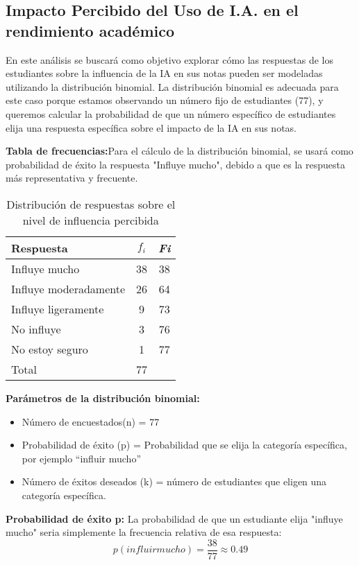 \subsection{Impacto Percibido del Uso de I.A. en el rendimiento académico}
En este análisis se buscará como objetivo explorar cómo las respuestas de los estudiantes sobre la influencia de la IA en sus notas pueden ser modeladas utilizando la distribución binomial. La distribución binomial es adecuada para este caso porque estamos observando un número fijo de estudiantes (77), y queremos calcular la probabilidad de que un número específico de estudiantes elija una respuesta específica sobre el impacto de la IA en sus notas.

\textbf{Tabla de frecuencias:}Para el cálculo de la distribución binomial, se usará como probabilidad de éxito la respuesta "Influye mucho", debido a que es la respuesta más representativa y frecuente.
\begin{table}[H]
	\centering
	\renewcommand{\arraystretch}{1.2}
	\begin{tabular}{l c c}
		\hline
		{Respuesta} & {\(f_i\)} & \textit{Fi}\\
		\hline
		Influye mucho          & 38 & 38\\
		Influye moderadamente  & 26 & 64\\
		Influye ligeramente    & 9  & 73\\
		No influye             & 3  & 76\\
		No estoy seguro        & 1  & 77\\
		\hline
		Total                  & 77 & \\
		\hline
	\end{tabular}
	\caption{Distribución de respuestas sobre el nivel de influencia percibida}
	\label{tabla:influencia}
\end{table}

\textbf{Parámetros de la distribución binomial:}
\begin{itemize}
	\item Número de encuestados(n) = 77
	\item Probabilidad de éxito (p) = Probabilidad que se elija la categoría específica, por ejemplo “influir mucho”
	\item Número de éxitos deseados (k) = número de estudiantes que eligen una categoría específica.
\end{itemize}

\textbf{Probabilidad de éxito p:}
La probabilidad de que un estudiante elija "influye mucho" seria simplemente la frecuencia relativa de esa respuesta:
\begin{equation*}
	p(influir mucho) = \dfrac{38}{77} \approx 0.49
\end{equation*}

